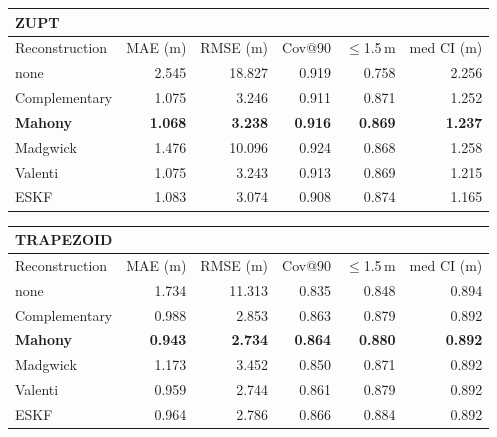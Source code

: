 \begin{tabular}{lrrrrr}
\toprule
\multicolumn{6}{l}{\textbf{ZUPT}} \\
\midrule
Reconstruction & MAE (m) & RMSE (m) & Cov@90 & $\le$1.5\,m & med CI (m) \\
\midrule
none & 2.545 & 18.827 & 0.919 & 0.758 & 2.256 \\
Complementary & 1.075 & 3.246 & 0.911 & 0.871 & 1.252 \\
\textbf{Mahony} & \textbf{1.068} & \textbf{3.238} & \textbf{0.916} & \textbf{0.869} & \textbf{1.237} \\
Madgwick & 1.476 & 10.096 & 0.924 & 0.868 & 1.258 \\
Valenti & 1.075 & 3.243 & 0.913 & 0.869 & 1.215 \\
ESKF & 1.083 & 3.074 & 0.908 & 0.874 & 1.165 \\
\bottomrule
\end{tabular}
\vspace{1em}

\begin{tabular}{lrrrrr}
\toprule
\multicolumn{6}{l}{\textbf{TRAPEZOID}} \\
\midrule
Reconstruction & MAE (m) & RMSE (m) & Cov@90 & $\le$1.5\,m & med CI (m) \\
\midrule
none & 1.734 & 11.313 & 0.835 & 0.848 & 0.894 \\
Complementary & 0.988 & 2.853 & 0.863 & 0.879 & 0.892 \\
\textbf{Mahony} & \textbf{0.943} & \textbf{2.734} & \textbf{0.864} & \textbf{0.880} & \textbf{0.892} \\
Madgwick & 1.173 & 3.452 & 0.850 & 0.871 & 0.892 \\
Valenti & 0.959 & 2.744 & 0.861 & 0.879 & 0.892 \\
ESKF & 0.964 & 2.786 & 0.866 & 0.884 & 0.892 \\
\bottomrule
\end{tabular}
\vspace{1em}
